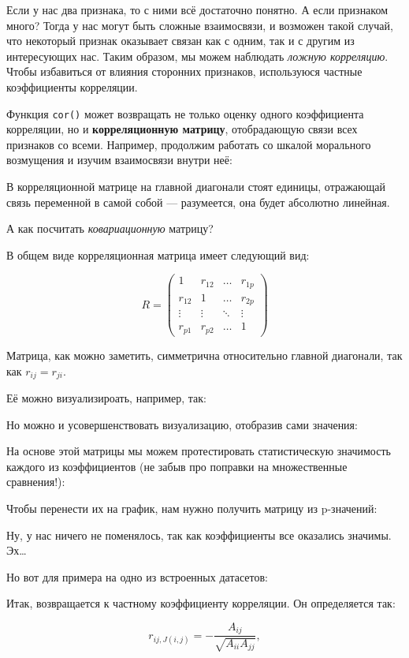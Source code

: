 \documentclass[
  letterpaper,
  DIV=11,
  numbers=noendperiod]{scrreprt}
\theoremstyle{definition}
\theoremstyle{remark}
\begin{document}
Если у нас два признака, то с ними всё достаточно понятно. А если
признаком много? Тогда у нас могут быть сложные взаимосвязи, и возможен
такой случай, что некоторый признак оказывает связан как с одним, так и
с другим из интересующих нас. Таким образом, мы можем наблюдать
\emph{ложную корреляцию}. Чтобы избавиться от влияния сторонних
признаков, используюся частные коэффициенты корреляции.

Функция \texttt{cor()} может возвращать не только оценку одного
коэффициента корреляции, но и \textbf{корреляционную матрицу},
отобрадающую связи всех признаков со всеми. Например, продолжим работать
со шкалой морального возмущения и изучим взаимосвязи внутри неё:

В корреляционной матрице на главной диагонали стоят единицы, отражающай
связь переменной в самой собой --- разумеется, она будет абсолютно
линейная.

А как посчитать \emph{ковариационную} матрицу?

В общем виде корреляционная матрица имеет следующий вид:

\[
R = 
\begin{pmatrix}
1 & r_{12} & \dots & r_{1p} \\
r_{12} & 1 & \dots & r_{2p} \\
\vdots & \vdots & \ddots & \vdots \\
r_{p1} & r_{p2} & \dots & 1
\end{pmatrix}
\]

Матрица, как можно заметить, симметрична относительно главной диагонали,
так как \(r_{ij} = r_{ji}\).

Её можно визуализироать, например, так:

Но можно и усовершенствовать визуализацию, отобразив сами значения:

На основе этой матрицы мы можем протестировать статистическую значимость
каждого из коэффициентов (не забыв про поправки на множественные
сравнения!):

Чтобы перенести их на график, нам нужно получить матрицу из p-значений:

Ну, у нас ничего не поменялось, так как коэффициенты все оказались
значимы. Эх\ldots{}

Но вот для примера на одно из встроенных датасетов:

Итак, возвращается к частному коэффициенту корреляции. Он определяется
так:

\[
r_{ij, J(i,j)} = - \frac{A_{ij}}{\sqrt{A_{ii} A_{jj}}},
\]
\end{document}
